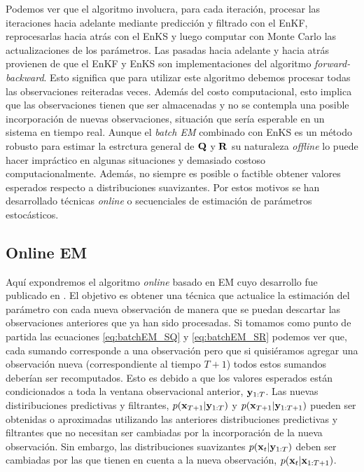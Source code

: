 Podemos ver que el algoritmo involucra, para cada iteración, procesar las iteraciones hacia adelante mediante predicción y filtrado con el EnKF, reprocesarlas hacia atrás con el EnKS y luego computar con Monte Carlo las actualizaciones de los parámetros. Las pasadas hacia adelante y hacia atrás provienen de que el EnKF y EnKS son implementaciones del algoritmo \textit{forward-backward}. Esto significa que para utilizar este algoritmo debemos procesar todas las observaciones reiteradas veces. Además del costo computacional, esto implica que las observaciones tienen que ser almacenadas y no se contempla una posible incorporación de nuevas observaciones, situación que sería esperable en un sistema en tiempo real. Aunque el \textit{batch EM} combinado con EnKS es un método robusto para estimar la estrctura general de $\mathbf{Q}$ y $\mathbf{R}$ su naturaleza \textit{offline} lo puede hacer impráctico en algunas situaciones y demasiado costoso computacionalmente. Además, no siempre es posible o factible obtener valores esperados respecto a distribuciones suavizantes. Por estos motivos se han desarrollado técnicas \textit{online} o secuenciales de estimación de parámetros estocásticos. 

\subsection{Online EM} \label{sec:onlineEM}

Aquí expondremos el algoritmo \textit{online} basado en EM cuyo desarrollo fue publicado en \cite{Cocucci2021}. El objetivo es obtener una técnica que actualice la estimación del parámetro con cada nueva observación de manera que se puedan descartar las observaciones anteriores que ya han sido procesadas. Si tomamos como punto de partida las ecuaciones \ref{eq:batchEM_SQ} y \ref{eq:batchEM_SR} podemos ver que, cada sumando corresponde a una observación pero que si quisiéramos agregar una observación nueva (correspondiente al tiempo $T+1$) todos estos sumandos deberían ser recomputados. Esto es debido a que los valores esperados están condicionados a toda la ventana observacional anterior, $\mathbf{y}_{1:T}$. Las nuevas distiribuciones predictivas y filtrantes, $p(\mathbf{x}_{T+1} | \mathbf{y}_{1:T})$ y $p(\mathbf{x}_{T+1} | \mathbf{y}_{1:T+1})$ pueden ser obtenidas o aproximadas utilizando las anteriores distribuciones predictivas y filtrantes que no necesitan ser cambiadas por la incorporación de la nueva observación. Sin embargo, las distribuciones suavizantes $p(\mathbf{x}_t | \mathbf{y}_{1:T})$ deben ser cambiadas por las que tienen en cuenta a la nueva observación, $p(\mathbf{x}_t | \mathbf{x}_{1:T+1})$.


